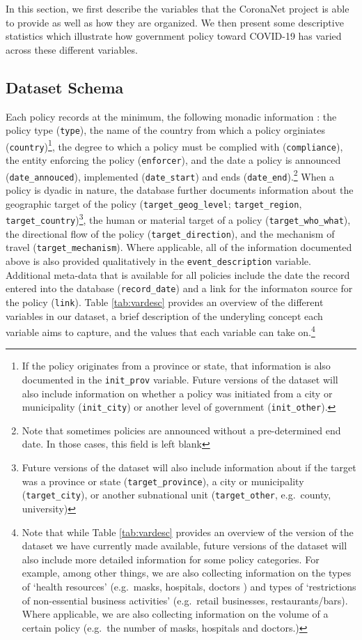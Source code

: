 \documentclass[]{article}
\let\rmarkdownfootnote\footnote%
\def\footnote{\protect\rmarkdownfootnote}
\begin{document}
In this section, we first describe the variables that the CoronaNet project is able to provide as well as how they are organized. We then present some descriptive statistics which illustrate how government policy toward COVID-19 has varied across these different variables.

\hypertarget{dataset-schema}{%
\subsection{Dataset Schema}\label{dataset-schema}}

Each policy records at the minimum, the following monadic information : the policy type (\texttt{type}), the name of the country from which a policy orginiates (\texttt{country})\footnote{If the policy originates from a province or state, that information is also documented in the \texttt{init\_prov} variable. Future versions of the dataset will also include information on whether a policy was initiated from a city or municipality (\texttt{init\_city}) or another level of government (\texttt{init\_other}).}, the degree to which a policy must be complied with (\texttt{compliance}), the entity enforcing the policy (\texttt{enforcer}), and the date a policy is announced (\texttt{date\_annouced}), implemented (\texttt{date\_start}) and ends (\texttt{date\_end}).\footnote{Note that sometimes policies are announced without a pre-determined end date. In those cases, this field is left blank} When a policy is dyadic in nature, the database further documents information about the geographic target of the policy (\texttt{target\_geog\_level}; \texttt{target\_region}, \texttt{target\_country})\footnote{Future versions of the dataset will also include information about if the target was a province or state (\texttt{target\_province}), a city or municipality (\texttt{target\_city}), or another subnational unit (\texttt{target\_other}, e.g.~county, university)}, the human or material target of a policy (\texttt{target\_who\_what}), the directional flow of the policy (\texttt{target\_direction}), and the mechanism of travel (\texttt{target\_mechanism}). Where applicable, all of the information documented above is also provided qualitatively in the \texttt{event\_description} variable. Additional meta-data that is available for all policies include the date the record entered into the database (\texttt{record\_date}) and a link for the informaton source for the policy (\texttt{link}). Table \ref{tab:vardesc} provides an overview of the different variables in our dataset, a brief description of the underyling concept each variable aims to capture, and the values that each variable can take on.\footnote{Note that while Table \ref{tab:vardesc} provides an overview of the version of the dataset we have currently made available, future versions of the dataset will also include more detailed information for some policy categories. For example, among other things, we are also collecting information on the types of `health resources' (e.g.~masks, hospitals, doctors ) and types of `restrictions of non-essential business activities' (e.g.~retail businesses, restaurants/bars). Where applicable, we are also collecting information on the volume of a certain policy (e.g.~the number of masks, hospitals and doctors.)}
\end{document}
